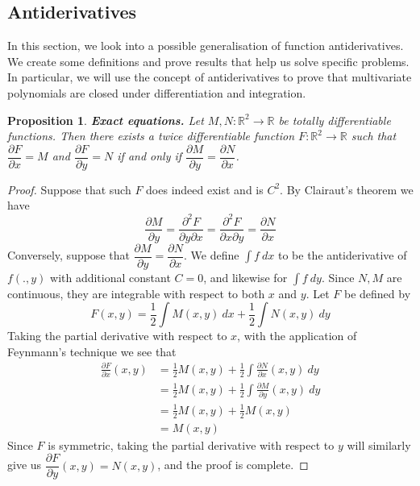 \documentclass{article}
\theoremstyle{plain} %
\numberwithin{thm}{section} %
\newtheorem{prop}[thm]{Proposition}
\theoremstyle{definition}
\begin{document}
    \subsection{Antiderivatives}
    In this section, we look into a possible generalisation of function antiderivatives. We create some definitions and prove results that help us solve specific problems. In particular, we will use the concept of antiderivatives to prove that multivariate polynomials are closed under differentiation and integration.
    \begin{prop}
        \textbf{Exact equations.} Let \(M,N : \mathbb{R}^2 \to \mathbb{R}\) be totally differentiable functions. Then there exists a twice differentiable function \(F: \mathbb{R}^2 \to \mathbb{R}\) such that \(\dfrac{\partial F}{\partial x} = M\) and \(\dfrac{\partial F}{\partial y} = N\) if and only if \(\dfrac{\partial M}{\partial y} = \dfrac{\partial N}{\partial x}\).
    \end{prop}
    \begin{proof}
        Suppose that such \(F\) does indeed exist and is \(C^2\). By Clairaut's theorem we have
        \[
            \frac{\partial M}{\partial y} = \frac{\partial^2 F}{\partial y \partial x} = \frac{\partial^2 F}{\partial x \partial y} = \frac{\partial N}{\partial x}
        \]
        Conversely, suppose that \(\dfrac{\partial M}{\partial y} = \dfrac{\partial N}{\partial x}\). We define \(\int f\ dx\) to be the antiderivative of \(f(.,y)\) with additional constant \(C=0\), and likewise for \(\int f\ dy\). Since \(N,M\) are continuous, they are integrable with respect to both \(x\) and \(y\). Let \(F\) be defined by
        \[
            F(x,y) = \frac{1}{2}\int M(x,y)\ dx + \frac{1}{2}\int N(x,y)\ dy
        \]
        Taking the partial derivative with respect to \(x\), with the application of Feynmann's technique we see that
        \begin{align*}
            \frac{\partial F}{\partial x} (x,y) &= \frac{1}{2}M(x,y) + \frac{1}{2}\int \frac{\partial N}{\partial x} (x,y)\ dy \\
            &= \frac{1}{2}M(x,y) + \frac{1}{2}\int \frac{\partial M}{\partial y} (x,y)\ dy \\
            &= \frac{1}{2}M(x,y) + \frac{1}{2}M(x,y) \\
            &= M(x,y)
        \end{align*}
        Since \(F\) is symmetric, taking the partial derivative with respect to \(y\) will similarly give us \(\dfrac{\partial F}{\partial y} (x,y) = N(x,y)\), and the proof is complete.
        \smallbreak
    \end{proof}
\end{document}
